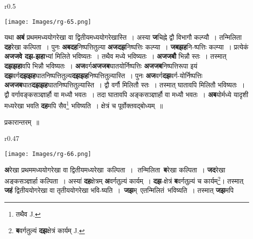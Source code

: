 \documentclass[11pt, openany]{book}
\begin{document}
\begin{wrapfigure}{r}{0.5\textwidth}
\vspace{-6mm}
\begin{flushright}
\texttt{[image: Images/rg-65.png]}
\end{flushright}
\vspace{-8mm}
\end{wrapfigure}

 यथा \;\textbf{अबं} \;प्रथममध्ययोगरेखा \;वा द्वितीयमध्ययोगरेखास्ति~। अस्या \textbf{ज}चिह्ने द्वौ विभागौ कल्प्यौ~। तन्मिलिता \textbf{दह}रेखा कल्पिता~। पुनः \textbf{अबदह}निष्पत्तितुल्या \textbf{अजदझ}निष्पत्तिः कल्प्या~। \textbf{जबझह}नि-ष्पत्तिः कल्प्या~। प्रत्येकं \textbf{अजजवे दझ-झहा}भ्यां मिलिते भविष्यतः~। तथैव मध्ये भविष्यतः~। \textbf{अजजबौ} भिन्नौ स्तः~। तस्मात् \textbf{दझझहा}वपि भिन्नौ भविष्यतः~। \textbf{अज}वर्ग\textbf{अजजब}घातयोर्निष्पत्तिः \textbf{अजजब}निष्पत्तिरूपा इयं \textbf{दझ}वर्ग\textbf{दझझह}घातनिष्पत्तितुल्य\textbf{दझझह}निष्पत्तितुल्यास्ति~। पुनः \textbf{अज}वर्ग\textbf{दझ}वर्ग-योर्निष्पत्तिः \textbf{अजजब}घात\textbf{दझझह}घातनिष्पत्तितुल्यास्ति~। द्वौ वर्गौ मिलितौ स्तः~। तस्मात् घातावपि मिलितौ भविष्यतः~। द्वौ वर्गावङ्कसञ्ज्ञार्हौ वा मध्यौ भवतः~। तदा घातावपि अङ्कसञ्ज्ञार्हौ वा मध्यौ भवतः~। \textbf{अब}योर्मध्ये यादृशी मध्यरेखा भवति \textbf{दह}मपि सैव\renewcommand{\thefootnote}{१}\footnote{तथैव {\en J.}} भविष्यति~। क्षेत्रं च पूर्वोक्तवद्बोध्यम्~॥
\vspace{2mm}

\begin{center}
प्रकारान्तरम्~॥
\end{center}

\begin{wrapfigure}{r}{0.47\textwidth}
\vspace{-10mm}
\begin{flushright}
\texttt{[image: Images/rg-66.png]}
\end{flushright}
\vspace{-8mm}
\end{wrapfigure}

 \textbf{अ}रेखा प्रथममध्ययोगरेखा वा द्वितीयमध्यरेखा \,\;कल्पिता~। \,\,तन्मिलिता \,\;\textbf{ब}रेखा कल्पिता~। \textbf{जद}रेखा अङ्कसञ्ज्ञार्हा कल्पिता~। अस्यां \textbf{दह}क्षेत्रम् \textbf{अ}वर्गतुल्यं कार्यम्~। \textbf{दझ}-क्षेत्रं \textbf{ब}वर्गतुल्यं च कार्यम्\renewcommand{\thefootnote}{२}\footnote{\textbf{ब}वर्गतुल्यं \textbf{दझ}क्षेत्रं कार्यम् {\en J.}}\;। तस्मात् \textbf{जहं} द्वितीययोगरेखा वा तृतीययोगरेखा भवि-ष्यति~। \,\textbf{जझ}म् \,एतन्मिलितं \,भविष्यति~। तस्मात् \textbf{जझ}मपि
\end{document}
